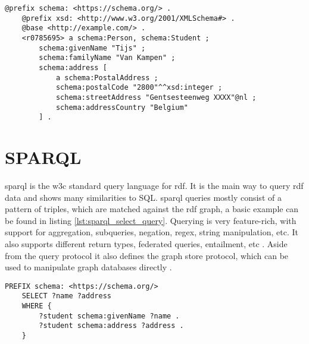 \begin{lstlisting}[caption={Basic turtle document using turtle features}, label={lst:basic_turtle_example_concise}, captionpos=b, breaklines=true, frame=single]
    @prefix schema: <https://schema.org/> .
    @prefix xsd: <http://www.w3.org/2001/XMLSchema#> .
    @base <http://example.com/> .
    <r0785695> a schema:Person, schema:Student ;
        schema:givenName "Tijs" ;
        schema:familyName "Van Kampen" ;
        schema:address [
            a schema:PostalAddress ;
            schema:postalCode "2800"^^xsd:integer ;
            schema:streetAddress "Gentsesteenweg XXXX"@nl ;
            schema:addressCountry "Belgium"
        ] .
\end{lstlisting}


\section{SPARQL}
\acrfull{sparql} is the \acrshort{w3c} standard query language for \acrshort{rdf}. It is the main way to query \acrshort{rdf} data and shows many similarities to SQL. \acrshort{sparql} queries mostly consist of a pattern of triples, which are matched against the \acrshort{rdf} graph, a basic example can be found in listing \ref{lst:sparql_select_query}. Querying is very feature-rich, with support for aggregation, subqueries, negation, regex, string manipulation, etc. It also supports different return types, federated queries, entailment, etc \citep{SPARQL1.1QL}. Aside from the query protocol it also defines the graph store protocol, which can be used to manipulate graph databases directly \citep{SPARQL1.1}.

\begin{lstlisting}[language=SPARQL, caption={Example of a basic \acrshort{sparql} SELECT query}, label={lst:sparql_select_query}, captionpos=b, frame=single]
    PREFIX schema: <https://schema.org/>
    SELECT ?name ?address
    WHERE {
        ?student schema:givenName ?name .
        ?student schema:address ?address .
    }
\end{lstlisting}

